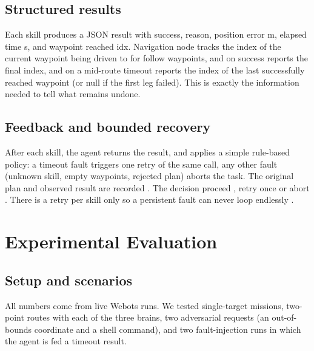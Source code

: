 \documentclass[11pt]{article}
\begin{document}
\subsection{Structured results}
Each skill produces a JSON result with success, reason, position error m, elapsed time s, and waypoint reached idx. Navigation node tracks the index of the current waypoint being driven to for follow waypoints, and on success reports the final index, and on a mid-route timeout reports the index of the last successfully reached waypoint (or null if the first leg failed).
This is exactly the information needed to tell what remains undone.

\subsection{Feedback and bounded recovery}
After each skill, the agent returns the result, and applies a simple rule-based policy: a timeout fault triggers one retry of the same call, any other fault (unknown skill, empty waypoints, rejected plan) aborts the task. The original plan and observed result are recorded . The decision proceed , retry once or abort . There is a retry per skill only so a persistent fault can never loop endlessly .

\section{Experimental Evaluation}

\subsection{Setup and scenarios}
All numbers come from live Webots runs. We tested single-target missions,
two-point routes with each of the three brains, two adversarial requests (an
out-of-bounds coordinate and a shell command), and two fault-injection runs in
which the agent is fed a timeout result.
\end{document}
